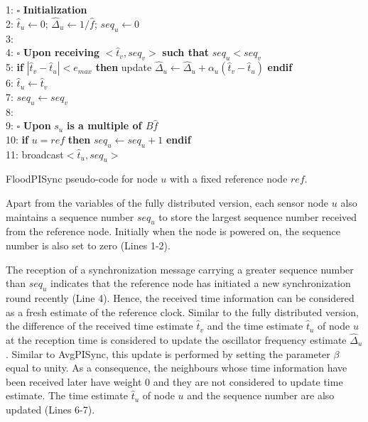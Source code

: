 \documentclass[english,a4paper,10pt,final]{article}
\numberwithin{equation}{section}
\numberwithin{figure}{section}
\begin{document}
\begin{algorithm}

\label{alg:PI}
1: $\square$ \textbf{Initialization} \\
2: $\hat{t}_{u}\leftarrow0$; $\hat{\Delta}_{u}\leftarrow 1/\hat{f}$; $seq_{u}\leftarrow0$  \\
3: \\
4: $\square$ \textbf{Upon receiving} $<\hat{t}_{v},seq_{v}>$ \textbf{such that} $seq_{u}<seq_{v}$ \\
5: \textbf{if} $|\hat{t}_{v} - \hat{t}_{u}| < e_{max}$ \textbf{then} update $\hat{\Delta}_{u}\leftarrow \hat{\Delta}_{u} + \alpha_u(\hat{t}_{v} - \hat{t}_{u})$ \textbf{endif}\\
6:   $\hat{t}_{u}\leftarrow \hat{t}_{v}$ \\
7:   $seq_{u}\leftarrow seq_{v}$ \\ 
8: \\
9: $\square$ \textbf{Upon} $s_{u}$ \textbf{is a multiple of $B\hat{f}$} \\
10: \textbf{if} $u=ref$ \textbf{then} $seq_{u}\leftarrow seq_{u}+1$ \textbf{endif} \\
11: broadcast$<\hat{t}_{u},seq_{u}>$ 

\caption{FloodPISync pseudo-code for node $u$ with a fixed reference node $ref$.}
\end{algorithm}

Apart from the variables of the fully distributed version, each sensor node $u$ also maintains a sequence number $seq_{u}$ to store the largest sequence number received from the reference node. Initially when the node is powered on, the sequence number is also set to zero (Lines 1-2).

The reception of a synchronization message carrying a greater sequence number than $seq_{u}$ indicates that the reference node has initiated a new synchronization round recently (Line 4). Hence, the received time information can be considered as a fresh estimate of the reference clock. Similar to the fully distributed version, the difference of the received time estimate $\hat{t}_{v}$ and the time estimate $\hat{t}_{u}$ of node $u$ at the reception time is considered to update the oscillator frequency estimate $\hat{\Delta}_{u}$. Similar to AvgPISync, this update is performed by setting the parameter $\beta$ equal to unity. As a consequence, the neighbours whose time information have been received later have weight 0 and they are not considered to update time estimate. The time estimate $\hat{t}_{u}$ of node $u$ and the sequence number are also updated (Lines 6-7). 
\end{document}
